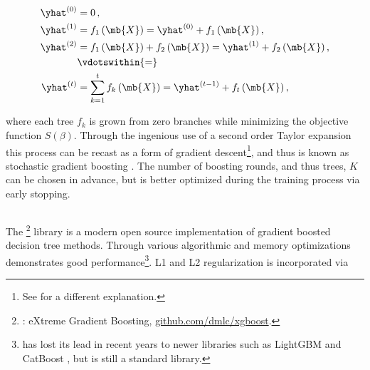 \begin{equation} \label{eq:boosting}
\begin{aligned}
\yhat^{\left(0\right)} &= 0\,, \\
\yhat^{\left(1\right)} &= f_1\left(\mb{X}\right) = \yhat^{\left(0\right)} + f_1\left(\mb{X}\right), \\
\yhat^{\left(2\right)} &= f_1\left(\mb{X}\right) + f_2\left(\mb{X}\right)= \yhat^{\left(1\right)} + f_2\left(\mb{X}\right), \\
                           &\vdotswithin{\displaystyle =} \\
\yhat^{\left(t\right)} &= \sum_{k=1}^t f_k\left(\mb{X}\right)= \yhat^{\left(t-1\right)} + f_t\left(\mb{X}\right),
\end{aligned}
\end{equation}

\noindent where each tree $f_{k}$ is grown from zero branches while minimizing the objective function $S\left(\beta\right)$.
Through the ingenious use of a second order Taylor expansion this process can
be recast as a form of gradient descent\footnote{See \cite{NIPS1999_96a93ba8} for a different explanation.}, and thus is known as
stochastic gradient boosting \cite{10.2307/2699986,FRIEDMAN2002367}.
The number of boosting rounds, and thus trees, $K$ can be chosen in advance,
but is better optimized during the training process via early stopping.

\subsection{\xgboost}%
\label{class:BDT:xgboost}

The \xgboost\footnote{\xgboost: eXtreme Gradient Boosting, \href{https://github.com/dmlc/xgboost}{github.com/dmlc/xgboost}.} library \cite{XGBoost}
is a modern open source implementation of gradient boosted decision tree methods.
Through various algorithmic and memory optimizations \xgboost demonstrates good performance\footnote{\xgboost has lost
its lead in recent years to newer libraries such as LightGBM \cite{LightGBM}
and CatBoost \cite{CatBoost}, but is still a standard library.}.
L1 and L2 regularization is incorporated via

